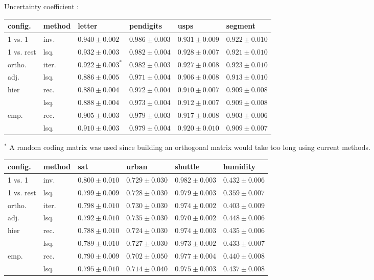 \documentclass[a0,landscape]{a0poster}
\begin{document}
\begin{multicols}{4}
Uncertainty coefficient \citep{Mills2018}:

{\small
\begin{tabular}{|ll|llll|}
\hline
config. & method & letter & pendigits & usps & segment \\
\hline\hline
        1 vs. 1 & inv. & $\mathbf{0.940 \pm 0.002}$ & $\mathbf{0.986 \pm 0.003}$ & $\mathbf{0.931 \pm 0.009}$ & $0.922 \pm 0.010 $ \\
1 vs. rest & lsq. & $0.932 \pm 0.003 $ & $0.982 \pm 0.004 $ & $0.928 \pm 0.007 $ & $0.921 \pm 0.010 $ \\
        ortho. & iter. & $0.922 \pm 0.003^*$ & $0.982 \pm 0.003 $ & $0.927 \pm 0.008 $ & $\mathbf{0.923 \pm 0.010}$ \\
adj. & lsq. & $0.886 \pm 0.005 $ & $0.971 \pm 0.004 $ & $0.906 \pm 0.008 $ & $0.913 \pm 0.010 $ \\
hier & rec. & $0.880 \pm 0.004 $ & $0.972 \pm 0.004 $ & $0.910 \pm 0.007 $ & $0.909 \pm 0.008 $ \\
& lsq. & $0.888 \pm 0.004 $ & $0.973 \pm 0.004 $ & $0.912 \pm 0.007 $ & $0.909 \pm 0.008 $ \\
emp. & rec. & $0.905 \pm 0.003 $ & $0.979 \pm 0.003 $ & $0.917 \pm 0.008 $ & $0.903 \pm 0.006 $ \\
& lsq. & $0.910 \pm 0.003 $ & $0.979 \pm 0.004 $ & $0.920 \pm 0.010 $ & $0.909 \pm 0.007 $ \\
\hline
\end{tabular}
        \vspace{1 ex}

        $^*$ A random coding matrix was used since building an orthogonal matrix would take too long using current methods.

\begin{tabular}{|ll|llll|}
\hline
config. & method & sat & urban & shuttle & humidity\\
\hline\hline
        1 vs. 1 & inv. & $\mathbf{0.800 \pm 0.010}$ & $0.729 \pm 0.030 $ & $\mathbf{0.982 \pm 0.003}$ & $0.432 \pm 0.006 $ \\
1 vs. rest & lsq. & $0.799 \pm 0.009 $ & $0.728 \pm 0.030 $ & $0.979 \pm 0.003 $ & $0.359 \pm 0.007 $ \\
ortho. & iter. & $0.798 \pm 0.010 $ & $0.730 \pm 0.030 $ & $0.974 \pm 0.002 $ & $0.403 \pm 0.009 $ \\
        adj. & lsq. & $0.792 \pm 0.010 $ & $\mathbf{0.735 \pm 0.030}$ & $0.970 \pm 0.002 $ & $\mathbf{0.448 \pm 0.006}$ \\
hier & rec. & $0.788 \pm 0.010 $ & $0.724 \pm 0.030 $ & $0.974 \pm 0.003 $ & $0.435 \pm 0.006 $ \\
& lsq. & $0.789 \pm 0.010 $ & $0.727 \pm 0.030 $ & $0.973 \pm 0.002 $ & $0.433 \pm 0.007 $ \\
emp. & rec. & $0.790 \pm 0.009 $ & $0.702 \pm 0.050 $ & $0.977 \pm 0.004 $ & $0.440 \pm 0.008 $ \\
& lsq. & $0.795 \pm 0.010 $ & $0.714 \pm 0.040 $ & $0.975 \pm 0.003 $ & $0.437 \pm 0.008 $ \\
\hline
\end{tabular}
} %


\end{multicols}
\end{document}
